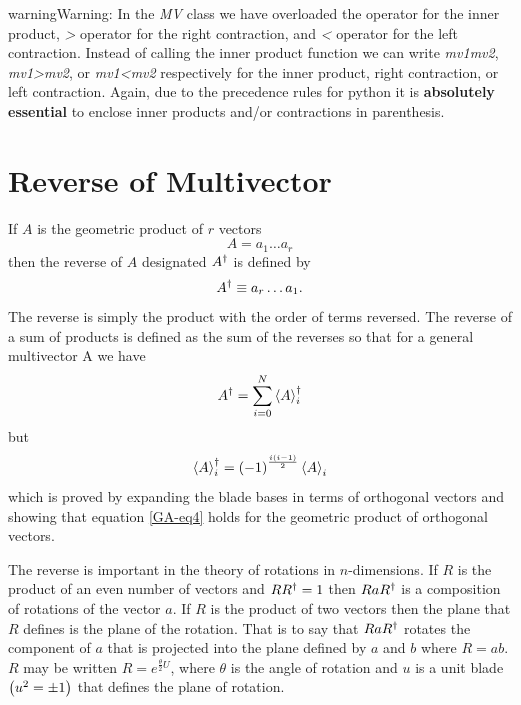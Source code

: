 \documentclass[letterpaper,10pt,english]{sphinxmanual}
\begin{document}
\begin{notice}{warning}{Warning:}
In the \emph{MV} class we have overloaded the \emph{\textbar{}} operator for the inner product,
\emph{\textgreater{}} operator for the right contraction, and \emph{\textless{}} operator for the left contraction.
Instead of calling the inner product function we can write \emph{mv1\textbar{}mv2}, \emph{mv1\textgreater{}mv2}, or
\emph{mv1\textless{}mv2} respectively for the inner product, right contraction, or left contraction.
Again, due to the precedence rules for python it is \textbf{absolutely essential} to enclose inner
products and/or contractions in parenthesis.
\end{notice}


\chapter{Reverse of Multivector}
\label{GA:reverse}\label{GA:reverse-of-multivector}
If $A$ is the geometric product of $r$ vectors
\begin{equation*}
  A = a_{1}\dots a_{r}
\end{equation*}
then the reverse of $A$ designated $A^{\dagger}$ is defined by
\begin{equation*}
  A^{\dagger} \equiv a_{r}\dots a_{1}.
\end{equation*}
The reverse is simply the product with the order of terms reversed.  The reverse
of a sum of products is defined as the sum of the reverses so that for a general
multivector A we have
\begin{equation*}
  A^{\dagger} = \sum_{i=0}^{N} \left < {A} \right >_{i}^{\dagger}
\end{equation*}
but
\label{GA:equation-eq4}\begin{equation}
  \left < {A} \right >_{i}^{\dagger} = \left ( -1\right )^{\frac{i\left ( i-1\right )}{2}}\left < {A} \right >_{i}
\end{equation}
which is proved by expanding the blade bases in terms of orthogonal vectors and
showing that equation \eqref{GA-eq4} holds for the geometric product of orthogonal
vectors.

The reverse is important in the theory of rotations in $n$-dimensions.  If
$R$ is the product of an even number of vectors and $RR^{\dagger} = 1$
then $RaR^{\dagger}$ is a composition of rotations of the vector $a$.
If $R$ is the product of two vectors then the plane that $R$ defines
is the plane of the rotation.  That is to say that $RaR^{\dagger}$ rotates the
component of $a$ that is projected into the plane defined by $a$ and
$b$ where $R=ab$.  $R$ may be written
$R = e^{\frac{\theta}{2}U}$, where $\theta$ is the angle of rotation
and $u$ is a unit blade $\left ( u^{2} = \pm 1\right )$ that defines the
plane of rotation.
\end{document}
